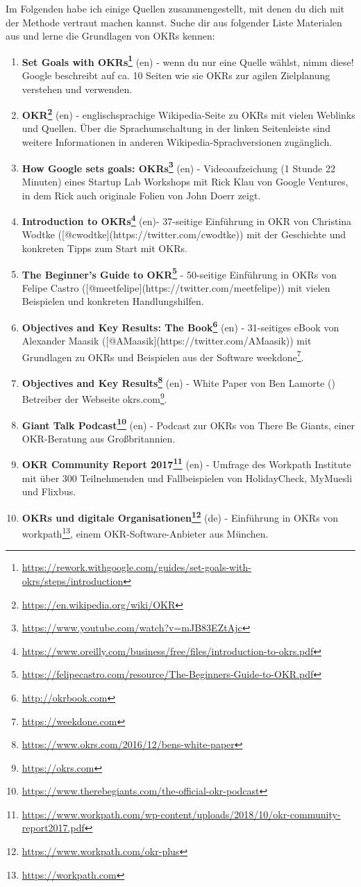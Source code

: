 \documentclass[
  ngerman,
  paper=a4,
,captions=tableheading
]{scrartcl}
\DeclareRobustCommand{\href}[2]{#2\footnote{\url{#1}}}
\providecommand{\tightlist}{%
  \setlength{\itemsep}{0pt}\setlength{\parskip}{0pt}}
\begin{document}
Im Folgenden habe ich einige Quellen zusammengestellt, mit denen du dich
mit der Methode vertraut machen kannst. Suche dir aus folgender Liste
Materialen aus und lerne die Grundlagen von OKRs kennen:

\begin{enumerate}
\def\labelenumi{\arabic{enumi}.}
\tightlist
\item
  \textbf{\href{https://rework.withgoogle.com/guides/set-goals-with-okrs/steps/introduction}{Set
  Goals with OKRs}} (en) - wenn du nur eine Quelle wählst, nimm diese!
  Google beschreibt auf ca. 10 Seiten wie sie OKRs zur agilen
  Zielplanung verstehen und verwenden.
\item
  \textbf{\href{https://en.wikipedia.org/wiki/OKR}{OKR}} (en) -
  englischsprachige Wikipedia-Seite zu OKRs mit vielen Weblinks und
  Quellen. Über die Sprachumschaltung in der linken Seitenleiste sind
  weitere Informationen in anderen Wikipedia-Sprachversionen zugänglich.
\item
  \textbf{\href{https://www.youtube.com/watch?v=mJB83EZtAjc}{How Google
  sets goals: OKRs}} (en) - Videoaufzeichung (1 Stunde 22 Minuten) eines
  Startup Lab Workshops mit Rick Klau von Google Ventures, in dem Rick
  auch originale Folien von John Doerr zeigt.
\item
  \textbf{\href{https://www.oreilly.com/business/free/files/introduction-to-okrs.pdf}{Introduction
  to OKRs}} (en)- 37-seitige Einführung in OKR von Christina Wodtke
  ({[}@cwodtke{]}(https://twitter.com/cwodtke)) mit der Geschichte und
  konkreten Tipps zum Start mit OKRs.
\item
  \textbf{\href{https://felipecastro.com/resource/The-Beginners-Guide-to-OKR.pdf}{The
  Beginner's Guide to OKR}} - 50-seitige Einführung in OKRs von Felipe
  Castro ({[}@meetfelipe{]}(https://twitter.com/meetfelipe)) mit vielen
  Beispielen und konkreten Handlungshilfen.
\item
  \textbf{\href{http://okrbook.com}{Objectives and Key Results: The
  Book}} (en) - 31-seitiges eBook von Alexander Maasik
  ({[}@AMaasik{]}(https://twitter.com/AMaasik)) mit Grundlagen zu OKRs
  und Beispielen aus der Software \href{https://weekdone.com}{weekdone}.
\item
  \textbf{\href{https://www.okrs.com/2016/12/bens-white-paper}{Objectives
  and Key Results}} (en) - White Paper von Ben Lamorte () Betreiber der
  Webseite \href{https://okrs.com}{okrs.com}.
\item
  \textbf{\href{https://www.therebegiants.com/the-official-okr-podcast}{Giant
  Talk Podcast}} (en) - Podcast zur OKRs von There Be Giants, einer
  OKR-Beratung aus Großbritannien.
\item
  \textbf{\href{https://www.workpath.com/wp-content/uploads/2018/10/okr-community-report2017.pdf}{OKR
  Community Report 2017}} (en) - Umfrage des Workpath Institute mit über
  300 Teilnehmenden und Fallbeispielen von HolidayCheck, MyMuesli und
  Flixbus.
\item
  \textbf{\href{https://www.workpath.com/okr-plus}{OKRs und digitale
  Organisationen}} (de) - Einführung in OKRs von
  \href{https://workpath.com}{workpath}, einem OKR-Software-Anbieter aus
  München.
\end{enumerate}
\end{document}
